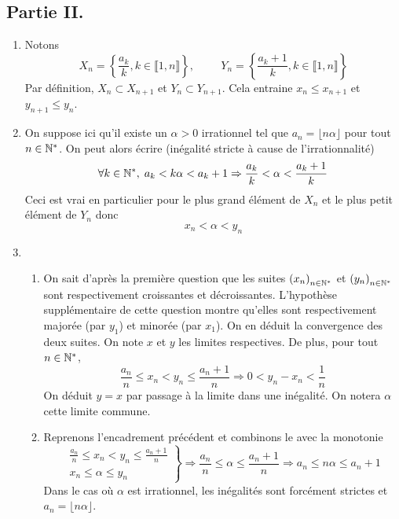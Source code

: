 \subsection*{Partie II.}
\begin{enumerate}
 \item Notons
\begin{displaymath}
 X_n = \left\lbrace \frac{a_k}{k}, k\in \llbracket 1,n \rrbracket \right\rbrace,\hspace{1cm}
 Y_n = \left\lbrace \frac{a_k+1}{k}, k\in \llbracket 1,n \rrbracket \right\rbrace
\end{displaymath}
Par définition, $X_n\subset X_{n+1}$ et $Y_n\subset Y_{n+1}$. Cela entraine $x_n\leq x_{n+1}$ et $y_{n+1}\leq y_n$.
 \item On suppose ici qu'il existe un $\alpha>0$ irrationnel tel que $a_n = \lfloor n\alpha \rfloor$ pour tout $n\in \mathbb{N}^*$. On peut alors écrire (inégalité stricte à cause de l'irrationnalité)
\begin{displaymath}
 \forall k\in \mathbb{N}^*,\; a_k < k\alpha < a_k+1 \Rightarrow \frac{a_k}{k}< \alpha < \frac{a_k +1}{k}
\end{displaymath}
Ceci est vrai en particulier pour le plus grand élément de $X_n$ et le plus petit élément de $Y_n$ donc
\begin{displaymath}
 x_n < \alpha < y_n
\end{displaymath}

 \item
\begin{enumerate}
 \item On sait d'après la première question que les suites $\left( x_n\right) _{n\in \mathbb{N}^*}$ et $\left(y_n\right) _{n\in \mathbb{N}^*}$ sont respectivement croissantes et décroissantes. L'hypothèse supplémentaire de cette question montre qu'elles sont respectivement majorée (par $y_1$) et minorée (par $x_1$). On en déduit la convergence des deux suites. On note $x$ et $y$ les limites respectives.\newline
De plus, pour tout $n\in\mathbb{N}^*$,
\begin{displaymath}
 \frac{a_n}{n} \leq x_n < y_n \leq \frac{a_n + 1}{n}\Rightarrow 0< y_n -x_n < \frac{1}{n}
\end{displaymath}
On déduit $y=x$ par passage à la limite dans une inégalité. On notera $\alpha$ cette limite commune.

 \item Reprenons l'encadrement précédent et combinons le avec la monotonie
\begin{displaymath}
 \left. 
\begin{aligned}
 \frac{a_n}{n} \leq x_n < y_n \leq \frac{a_n + 1}{n}\\ x_n \leq \alpha \leq y_n
\end{aligned}
\right\rbrace 
\Rightarrow
\frac{a_n}{n} \leq \alpha \leq \frac{a_n + 1}{n}
\Rightarrow a_n \leq n\alpha \leq a_n +1
\end{displaymath}
Dans le cas où $\alpha$ est irrationnel, les inégalités sont forcément strictes et $a_n=\lfloor n\alpha \rfloor$.


\end{enumerate}
\end{enumerate}
